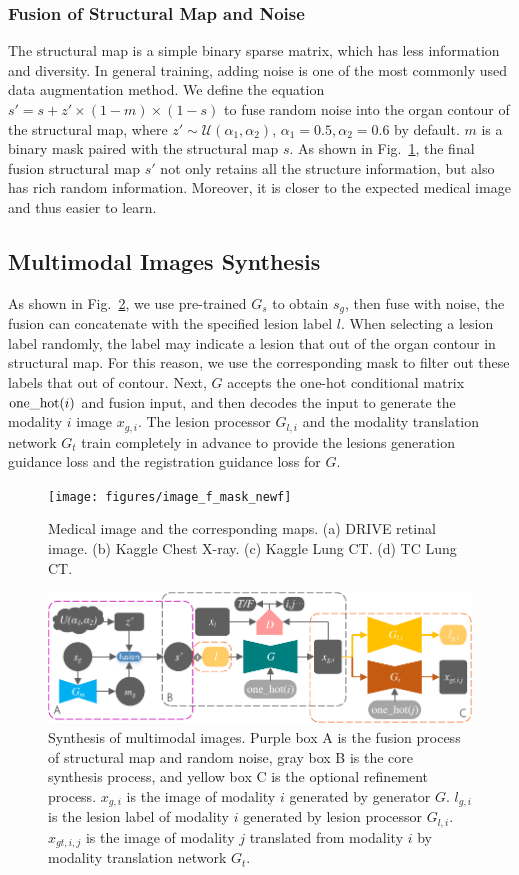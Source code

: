 \documentclass[runningheads]{llncs}
\begin{document}
	\subsubsection{Fusion of Structural Map and Noise}	
	The structural map is a simple binary sparse matrix, which has less information and diversity. In general training, adding noise is one of the most commonly used data augmentation method. We define the equation $s'=s+z'\times(1-m)\times(1-s)$ to fuse random noise into the organ contour of the structural map, where $z'\sim\mathcal{U}(\alpha_1,\alpha_2)$, $\alpha_1 =0.5,\alpha_2=0.6$ by default. $m$ is a binary mask paired with the structural map $s$. As shown in Fig.~\ref{image_and_f}, the final fusion structural map $s'$ not only retains all the structure information, but also has rich random information. Moreover, it is closer to the expected medical image and thus easier to learn. 	
	\subsection{Multimodal Images Synthesis}
	As shown in Fig.~\ref{mm_mri_generate}, we use pre-trained $G_s$ to obtain $s_g$, then fuse with noise, the fusion can concatenate with the specified lesion label $l$. When selecting a lesion label randomly, the label may indicate a lesion that out of the organ contour in structural map. For this reason, we use the corresponding mask to filter out these labels that out of contour. Next, $G$ accepts the one-hot conditional matrix ${\rm one\_hot}(i)$ and fusion input, and then decodes the input to generate the modality $i$ image $x_{g,i}$. The lesion processor $G_{l,i}$ and the modality translation network $G_t$ train completely in advance to provide the lesions generation guidance loss and the registration guidance loss for $G$.
	\begin{figure}[th]
		\centering
		\texttt{[image: figures/image\_f\_mask\_newf]}
		\caption{Medical image and the corresponding maps. (a) DRIVE retinal image. (b) Kaggle Chest X-ray. (c) Kaggle Lung CT. (d) TC Lung CT.}
		\label{image_and_f}
	\end{figure}
	\begin{figure}[th]
		\centering
		\includegraphics[width=1\columnwidth]{figures/mm_mri_generate_train}
		\caption{Synthesis of multimodal images. Purple box A is the fusion process of structural map and random noise, gray box B is the core synthesis process, and yellow box C is the optional refinement process. 
			$x_{g,i}$ is the image of modality $i$ generated by generator $G$. 
			$l_{g,i}$ is the lesion label of modality $i$ generated by lesion processor $G_{l,i}$.
			$x_{gt,i,j}$ is the image of modality $j$ translated from modality $i$ by modality translation network $G_t$.
		}
		\label{mm_mri_generate}
	\end{figure}
	
\end{document}
